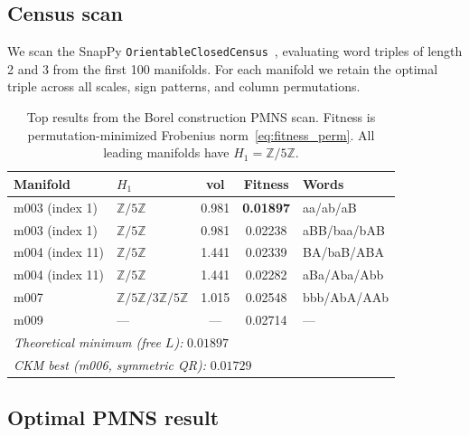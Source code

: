 \documentclass[floatfix,aps,prd,twocolumn,showpacs,superscriptaddress,longbibliography]{revtex4-2}
\newcommand{\Zfive}{\mathbb{Z}/5\mathbb{Z}}
\begin{document}
\subsection{Census scan}

We scan the SnapPy \texttt{OrientableClosedCensus}~\cite{snappy},
evaluating word triples of length 2 and 3 from the first 100 manifolds.
For each manifold we retain the optimal triple across all scales,
sign patterns, and column permutations.

\begin{table}[!t]
\centering
\caption{Top results from the Borel construction PMNS scan.
Fitness is permutation-minimized Frobenius norm~\eqref{eq:fitness_perm}.
All leading manifolds have $H_1 = \Zfive$.}
\label{tab:pmns_results}
\begin{tabular}{llccl}
\toprule
Manifold & $H_1$ & vol & Fitness & Words \\
\midrule
m003 (index 1) & $\Zfive$        & 0.981 & \textbf{0.01897} & aa/ab/aB \\
m003 (index 1) & $\Zfive$        & 0.981 & 0.02238          & aBB/baa/bAB \\
m004 (index 11)& $\Zfive$        & 1.441 & 0.02339          & BA/baB/ABA \\
m004 (index 11)& $\Zfive$        & 1.441 & 0.02282          & aBa/Aba/Abb \\
m007           & $\Zfive/3\Zfive$& 1.015 & 0.02548          & bbb/AbA/AAb \\
m009           & ---             & ---   & 0.02714          & --- \\
\midrule
\multicolumn{5}{l}{\textit{Theoretical minimum (free $L$):} \quad $0.01897$} \\
\multicolumn{5}{l}{\textit{CKM best (m006, symmetric QR):} \quad $0.01729$} \\
\bottomrule
\end{tabular}
\end{table}

\subsection{Optimal PMNS result}
\end{document}

